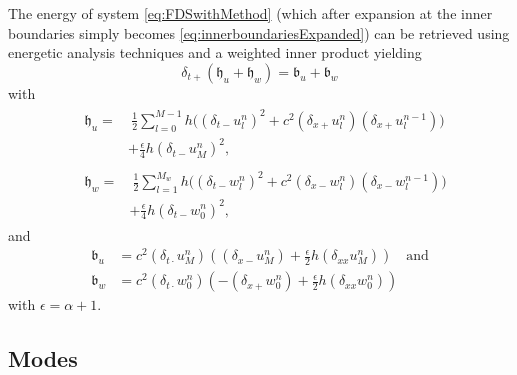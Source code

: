The energy of system \eqref{eq:FDSwithMethod} (which after expansion at the inner boundaries simply becomes \eqref{eq:innerboundariesExpanded}) can be retrieved using energetic analysis techniques \cite{bilbao2009} and a weighted inner product yielding
\begin{equation}
    \delta_{t+}\left(\mathfrak{h}_u + \mathfrak{h}_w\right) = \mathfrak{b}_u + \mathfrak{b}_w
\end{equation}
with 
\begin{align}
&\begin{aligned}
    \mathfrak{h}_u =&\  \frac{1}{2}\sum_{l=0}^{M-1}h\Big((\delta_{t-}u_l^n)^2 + c^2 (\delta_{x+}u_l^n)(\delta_{x+}u_l^{n-1})\Big) \\
    &+ \frac{\epsilon}{4}h(\delta_{t-}u_M^n)^2,
\end{aligned}
\\
&\begin{aligned}
    \mathfrak{h}_w=&\ \frac{1}{2}\sum_{l=1}^{M_w} h\Big((\delta_{t-}w_l^n)^2+c^2(\delta_{x-}w_l^n)(\delta_{x-}w_l^{n-1}) \Big)\\
    &+ \frac{\epsilon}{4}h(\delta_{t-}w_0^n)^2,
    \end{aligned}
\end{align}
and 
\begin{equation}\label{eq:boundaryTerms}
    \begin{aligned}
    \mathfrak{b}_u &= c^2(\delta_{t\cdot}u_M^n)\left((\delta_{x-}u_M^n)+\frac{\epsilon}{2}h(\delta_{xx}u_M^n)\right) \quad \text{and}\\
    \mathfrak{b}_w &= c^2(\delta_{t\cdot}w_0^n)\left(-(\delta_{x+}w_0^n)+\frac{\epsilon}{2}h(\delta_{xx}w_0^n)\right)
    \end{aligned}
\end{equation}
with $\epsilon = \alpha + 1$. \SWcomment[When $\alpha = 0$, $u_M^n = w_0^n$ and the boundary terms vanish. When $\alpha \rightarrow 1$ the boundary terms reduce to 
\begin{equation}
    \mathfrak{b}_u+\mathfrak{b}_w = -\frac{c^2}{2}\delta_{t+}\big(h(\delta_{x+}u_M^n)(\delta_{x+}u_M^{n-1})\big),  
\end{equation}
which is essentially the potential energy between the inner boundaries. See Appendix B.4 (p. 17) in \url{https://www.overleaf.com/project/5eec78b95071c2000121fff4} for a derivation.]
\subsection{Modes}

